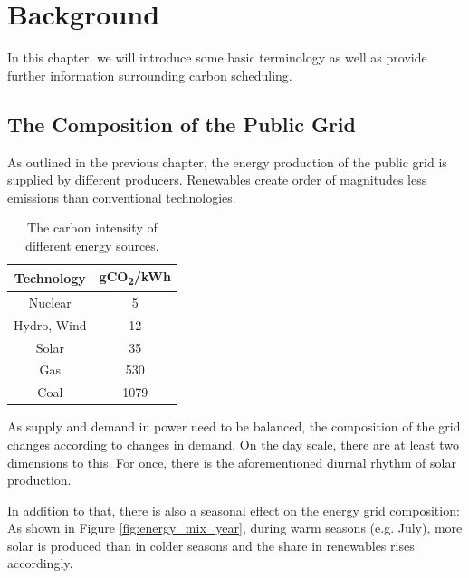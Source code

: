 \chapter{Background}
\label{chap:backgroud}

In this chapter, we will introduce some basic terminology as well as provide further information surrounding carbon scheduling.

\section{The Composition of the Public Grid}

As outlined in the previous chapter, the energy production of the public grid is supplied by different producers.
Renewables create order of magnitudes less emissions than conventional technologies.  

\begin{table}[h!]
    \centering
    \begin{tabular}{|c|c|}
    \hline
        Technology & gCO\textsubscript{2}/kWh \\ \hline
        Nuclear & 5 \\ \hline
        Hydro, Wind & 12 \\ \hline
        Solar & 35 \\ \hline
        Gas & 530 \\ \hline
        Coal & 1079 \\ \hline
    \end{tabular}
    \caption{The carbon intensity of different energy sources.}
    \label{tab:carbon_intensities}
\end{table}

As supply and demand in power need to be balanced, the composition of the grid changes according to changes in demand.
On the day scale, there are at least two dimensions to this. For once, there is the aforementioned diurnal rhythm of solar production.

In addition to that, there is also a seasonal effect on the energy grid composition:
As shown in Figure \ref{fig:energy_mix_year}, during warm seasons (e.g. July), more solar is produced than in colder seasons and the share in renewables rises accordingly.

